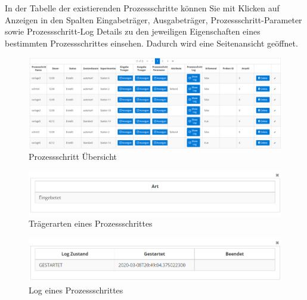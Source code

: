 \documentclass[enabledeprecatedfontcommands,fontsize=12pt,paper=a4,twoside]{scrartcl}
\begin{document}
In der Tabelle der existierenden Prozessschritte können Sie mit Klicken auf Anzeigen in den Spalten Eingabeträger, Ausgabeträger, Prozessschritt-Parameter sowie Prozessschritt-Log Details zu den jeweiligen Eigenschaften eines bestimmten Prozessschrittes einsehen. Dadurch wird eine Seitenansicht geöffnet. \\

\begin{figure}[h!]
\begin{center}
 \includegraphics[scale=0.6]{screenshots/pk/prozessschrittubersicht.png}
  \caption{Prozessschritt Übersicht}
  \label{fig:boat1}
\end{center}
\end{figure}

\begin{figure}[h!]
\begin{center}
 \includegraphics[scale=0.6]{screenshots/pk/prozessschritteingabe.png}
  \caption{Trägerarten eines Prozessschrittes}
  \label{fig:boat1}
\end{center}
\end{figure}

\begin{figure}[h!]
\begin{center}
 \includegraphics[scale=0.6]{screenshots/pk/prozessschrittlog.png}
  \caption{Log eines Prozessschrittes}
  \label{fig:boat1}
\end{center}
\end{figure}
\end{document}
